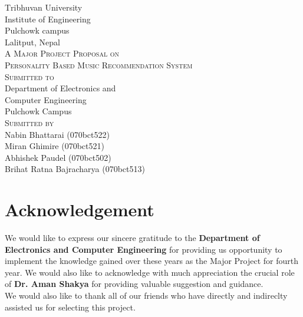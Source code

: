 \documentclass{article}
\begin{document}
\begin{titlepage}
  \begin{center}
    {\Huge\textsc Tribhuvan University}\\
    [0.03in]
    {\LARGE\textsc Institute of Engineering}\\
    [0.05in]
    {\Large\textsc Pulchowk campus}\\
    [0.02in]
    {\large\textsc Lalitput, Nepal}\\
    [2in]

    {\LARGE \textsc{A Major Project Proposal on}}\\
    [0.5cm]
    {\Large \textsc{Personality Based Music Recommendation System}}\\
    [1.8in]
    
    {\LARGE\textsc{Submitted to}}\\
    [0.05in]
    {\large Department of Electronics and }\\
    {\large Computer Engineering}\\
    {\large Pulchowk Campus}\\
    [1in]

    {\LARGE \textsc{\large Submitted by}}\\
    [0.05in]
    {\large Nabin Bhattarai (070bct522)}\\
    {\large Miran Ghimire (070bct521)}\\
    {\large Abhishek Paudel (070bct502)}\\
    {\large Brihat Ratna Bajracharya (070bct513)}\\
  \end{center}
\end{titlepage}

\setcounter{page}{2}

\section*{Acknowledgement}
	We would like to express our sincere gratitude to the \textbf{Department of Electronics and Computer Engineering} for providing us opportunity to implement the knowledge gained over these years as the Major Project for fourth year. We would also like to acknowledge with much appreciation the crucial role of \textbf{Dr. Aman Shakya} for providing valuable suggestion and guidance.\\
We would also like to thank all of our friends who have directly and indireclty assisted us for selecting this project.
\cleardoublepage
\end{document}
